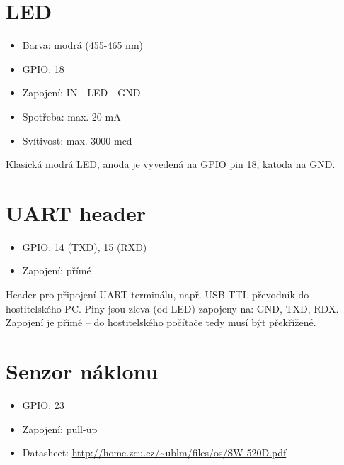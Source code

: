 \documentclass{article}
\newcommand\lang[2]{#1}
\begin{document}
\section{LED}

\begin{itemize}
	\item \lang{Barva: modrá}{Color: blue} (455-465 nm)
	\item GPIO: 18
	\item \lang{Zapojení}{Wiring}: IN - LED - GND
	\item \lang{Spotřeba}{Current}: max. 20 mA
	\item \lang{Svítivost}{Luminosity}: max. 3000 mcd
\end{itemize}

\lang{Klasická modrá LED, anoda je vyvedená na GPIO pin 18, katoda na GND.}{Standard blue LED, anode is connected to GPIO 18, cathode is connected to GND.}

\section{UART header}

\begin{itemize}
	\item GPIO: 14 (TXD), 15 (RXD)
	\item \lang{Zapojení: přímé}{Wiring: direct}
\end{itemize}

\lang{Header pro připojení UART terminálu, např. USB-TTL převodník do hostitelského PC. Piny jsou zleva (od LED) zapojeny na: GND, TXD, RDX. Zapojení je přímé -- do hostitelského počítače tedy musí být překřížené.}
{Header for UART terminal connection, e.g. the USB-TTL converter to host PC. Pins are connected (from left to right) to: GND, TXD, RXD. The wiring is direct -- wiring should be crossed over to the other end.}

\section{\lang{Senzor náklonu}{Tilt sensor}}

\begin{itemize}
	\item GPIO: 23
	\item \lang{Zapojení}{Wiring}: pull-up
	\item Datasheet: \url{http://home.zcu.cz/~ublm/files/os/SW-520D.pdf}
\end{itemize}
\end{document}
